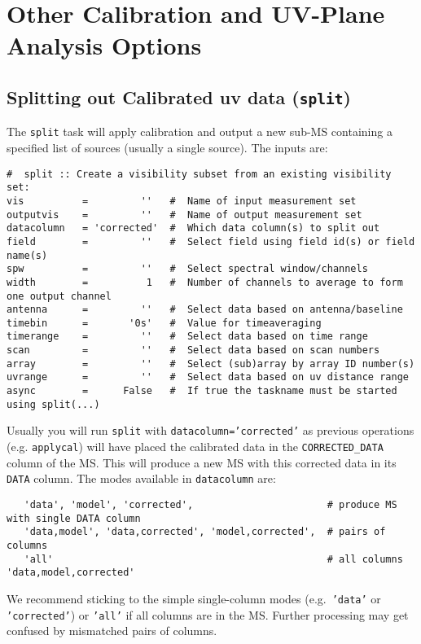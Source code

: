 \section{Other Calibration and UV-Plane Analysis Options}
\label{section:cal.other}

\subsection{Splitting out Calibrated uv data ({\tt split})}
\label{section:cal.other.split}

The {\tt split} task will apply calibration and output a new sub-MS
containing a specified list of sources (usually a single source).
The inputs are:
\small
\begin{verbatim}
#  split :: Create a visibility subset from an existing visibility set:
vis          =         ''   #  Name of input measurement set
outputvis    =         ''   #  Name of output measurement set
datacolumn   = 'corrected'  #  Which data column(s) to split out
field        =         ''   #  Select field using field id(s) or field name(s)
spw          =         ''   #  Select spectral window/channels
width        =          1   #  Number of channels to average to form one output channel
antenna      =         ''   #  Select data based on antenna/baseline
timebin      =       '0s'   #  Value for timeaveraging
timerange    =         ''   #  Select data based on time range
scan         =         ''   #  Select data based on scan numbers
array        =         ''   #  Select (sub)array by array ID number(s)
uvrange      =         ''   #  Select data based on uv distance range
async        =      False   #  If true the taskname must be started using split(...)
\end{verbatim}
\normalsize

Usually you will run {\tt split} with {\tt datacolumn='corrected'} as
previous operations (e.g. {\tt applycal}) will have placed the
calibrated data in the {\tt CORRECTED\_DATA} column of the MS.  This
will produce a new MS with this corrected data in its {\tt DATA} 
column.  The modes available in {\tt datacolumn} are:
\small
\begin{verbatim}
   'data', 'model', 'corrected',                       # produce MS with single DATA column
   'data,model', 'data,corrected', 'model,corrected',  # pairs of columns
   'all'                                               # all columns 'data,model,corrected'
\end{verbatim}
\normalsize
We recommend sticking to the simple single-column modes (e.g.\ 
{\tt 'data'} or {\tt 'corrected'}) or {\tt 'all'} if all columns are in
the MS.  Further processing may get confused by mismatched pairs of columns.

